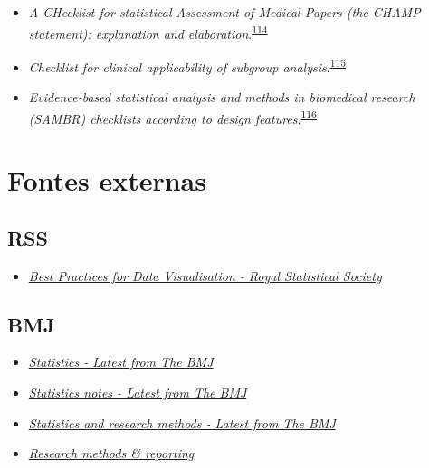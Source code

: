 \documentclass[
]{book}
\providecommand{\tightlist}{%
  \setlength{\itemsep}{0pt}\setlength{\parskip}{0pt}}
\begin{document}
\begin{itemize}
\item
  \emph{A CHecklist for statistical Assessment of Medical Papers (the CHAMP statement): explanation and elaboration}.\textsuperscript{\protect\hyperlink{ref-Mansournia2021}{114}}
\item
  \emph{Checklist for clinical applicability of subgroup analysis}.\textsuperscript{\protect\hyperlink{ref-Gil-Sierra2020}{115}}
\item
  \emph{Evidence‐based statistical analysis and methods in biomedical research (SAMBR) checklists according to design features}.\textsuperscript{\protect\hyperlink{ref-dwivedi2019}{116}}
\end{itemize}

\hypertarget{fontes-externas}{%
\chapter{\texorpdfstring{\textbf{Fontes externas}}{Fontes externas}}\label{fontes-externas}}

\hypertarget{rss}{%
\section{RSS}\label{rss}}

\begin{itemize}
\tightlist
\item
  \href{https://royal-statistical-society.github.io/datavisguide/}{\emph{Best Practices for Data Visualisation - Royal Statistical Society}}
\end{itemize}

\hypertarget{bmj}{%
\section{BMJ}\label{bmj}}

\begin{itemize}
\item
  \href{https://www.bmj.com/specialties/statistics}{\emph{Statistics - Latest from The BMJ}}
\item
  \href{https://www.bmj.com/specialties/statistics-notes}{\emph{Statistics notes - Latest from The BMJ}}
\item
  \href{https://www.bmj.com/specialties/statistics-and-research-methods}{\emph{Statistics and research methods - Latest from The BMJ}}
\item
  \href{https://www.bmj.com/research/research-methods-and-reporting}{\emph{Research methods \& reporting}}
\end{itemize}
\end{document}
